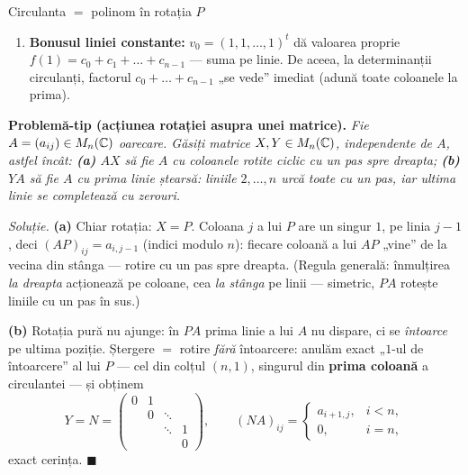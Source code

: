 \begin{tehbox}{Circulanta $=$ polinom în rotația $P$}
\begin{enumerate}[leftmargin=*, itemsep=2pt]
\[
C\,v_j=f(\omega^j)\,v_j .
\]
Cei $n$ vectori sunt liniar independenți (matricea lor e Vandermonde cu noduri distincte $\omega^0,\dots,\omega^{n-1}$, vezi determinantul Vandermonde din Capitolul~), deci am diagonalizat dintr-un foc \emph{orice} circulantă, și
\[
\boxed{\;\det C=\prod_{j=0}^{n-1}f(\omega^j)=\prod_{j=0}^{n-1}\bigl(c_0+c_1\omega^j+c_2\omega^{2j}+\dots+c_{n-1}\omega^{(n-1)j}\bigr).\;}
\]
\item \textbf{Bonusul liniei constante:} $v_0=(1,1,\dots,1)^t$ dă valoarea proprie $f(1)=c_0+c_1+\dots+c_{n-1}$ --- suma pe linie. De aceea, la determinanții circulanți, factorul $c_0+\dots+c_{n-1}$ „se vede'' imediat (adună toate coloanele la prima).
\end{enumerate}
\end{tehbox}

\textbf{Problemă-tip (acțiunea rotației asupra unei matrice).} \emph{Fie $A=(a_{ij})\in M_n(\mathbb{C})$ oarecare. Găsiți matrice $X,Y\in M_n(\mathbb{C})$, independente de $A$, astfel încât: \textbf{(a)} $AX$ să fie $A$ cu coloanele rotite ciclic cu un pas spre dreapta; \textbf{(b)} $YA$ să fie $A$ cu prima linie \emph{ștearsă}: liniile $2,\dots,n$ urcă toate cu un pas, iar ultima linie se completează cu zerouri.}

\emph{Soluție.} \textbf{(a)} Chiar rotația: $X=P$. Coloana $j$ a lui $P$ are un singur $1$, pe linia $j-1$, deci $(AP)_{ij}=a_{i,j-1}$ (indici modulo $n$): fiecare coloană a lui $AP$ „vine'' de la vecina din stânga --- rotire cu un pas spre dreapta. (Regula generală: înmulțirea \emph{la dreapta} acționează pe coloane, cea \emph{la stânga} pe linii --- simetric, $PA$ rotește liniile cu un pas în sus.)

\textbf{(b)} Rotația pură nu ajunge: în $PA$ prima linie a lui $A$ nu dispare, ci se \emph{întoarce} pe ultima poziție. Ștergere $=$ rotire \emph{fără} întoarcere: anulăm exact „$1$-ul de întoarcere'' al lui $P$ --- cel din colțul $(n,1)$, singurul din \textbf{prima coloană} a circulantei --- și obținem
\[
Y=N=\begin{pmatrix}0&1&&\\&0&\ddots&\\&&\ddots&1\\&&&0\end{pmatrix},
\qquad
(NA)_{ij}=\begin{cases}a_{i+1,j},&i<n,\\[1mm] 0,&i=n,\end{cases}
\]
exact cerința. $\blacksquare$

